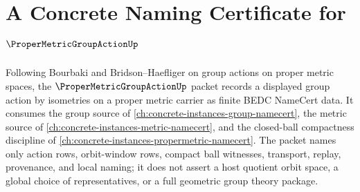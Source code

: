 \chapter{A Concrete Naming Certificate for $\ProperMetricGroupActionUp$}
\label{ch:concrete-instances-proper-metric-group-action-namecert}

Following Bourbaki and Bridson--Haefliger on group actions on proper metric spaces, the $\ProperMetricGroupActionUp$ packet records a displayed group action by isometries on a proper metric carrier as finite BEDC NameCert data. It consumes the group source of \autoref{ch:concrete-instances-group-namecert}, the metric source of \autoref{ch:concrete-instances-metric-namecert}, and the closed-ball compactness discipline of \autoref{ch:concrete-instances-propermetric-namecert}. The packet names only action rows, orbit-window rows, compact ball witnesses, transport, replay, provenance, and local naming; it does not assert a host quotient orbit space, a global choice of representatives, or a full geometric group theory package.

